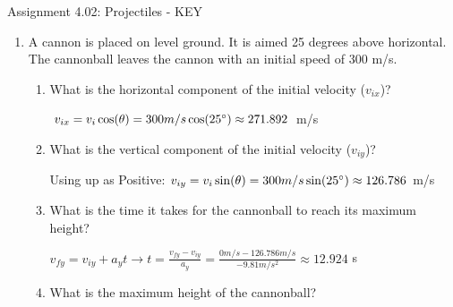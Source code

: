 \documentclass[letterpaper, 12pt]{article}
\begin{document}


\begin{center} Assignment 4.02: Projectiles - KEY
\end{center}





\begin{enumerate}

\item A cannon is placed on level ground.  It is aimed 25 degrees above horizontal.   The cannonball leaves the cannon with an initial speed of 300 m/s.  
\begin{enumerate}
	\item What is the horizontal component of the initial velocity ($v_{ix}$)?
	
		\vspace{0.1in}
\color{red}
	$ v_{ix} = v_i \cos (\theta) = 300 m/s \cos (25 \degree )  \approx 271.892$  m/s

	\vspace{0.1in}
\color{black}

	\item What is the vertical component of the initial velocity ($v_{iy}$)?
	
\color{red}
	\vspace{0.1in}
	Using up as Positive:
$ v_{iy} = v_i \sin (\theta) = 300 m/s \sin (25 \degree )   \approx 126.786$  m/s

	\vspace{0.1in}
\color{black}

	\item What is the time it takes for the cannonball to reach its maximum height?	
	

	\vspace{0.1in}
		\color{red}
 $v_{fy} = v_{iy} + a_y t \longrightarrow t = \frac{v_{fy} - v_{iy}}{a_y} = \frac{0 m/s - 126.786 m/s}{-9.81 m/s^2} \approx 12.924 $ s
	
	\color{black}
	
		\vspace{0.1in}
	\item What is the maximum height of the cannonball?


\end{enumerate}
\end{enumerate}
\end{document}
